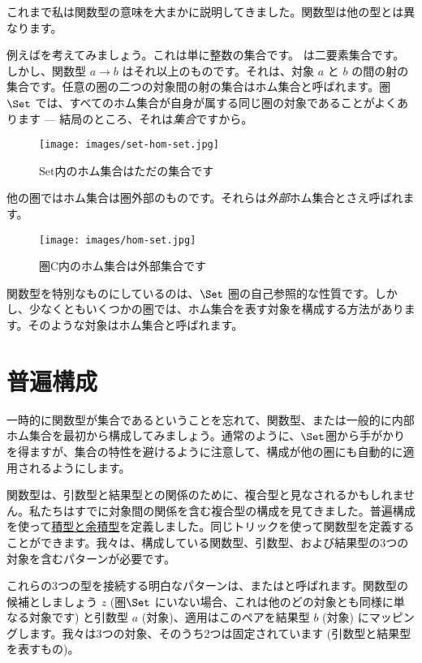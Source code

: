 
\lettrine[lhang=0.17]{こ}{れまで}私は関数型の意味を大まかに説明してきました。関数型は他の型とは異なります。

例えばを考えてみましょう。これは単に整数の集合です。
は二要素集合です。しかし、関数型 $a\to b$ はそれ以上のものです。それは、対象 $a$ と $b$ の間の射の集合です。任意の圏の二つの対象間の射の集合はホム集合と呼ばれます。圏 $\Set$ では、すべてのホム集合が自身が属する同じ圏の対象であることがよくあります  --- 結局のところ、それは\emph{集合}ですから。

\begin{figure}[H]
  \centering
  \texttt{[image: images/set-hom-set.jpg]}
  \caption{Set内のホム集合はただの集合です}
\end{figure}

\noindent
他の圏ではホム集合は圏外部のものです。それらは\emph{外部}ホム集合とさえ呼ばれます。

\begin{figure}[H]
  \centering
  \texttt{[image: images/hom-set.jpg]}
  \caption{圏C内のホム集合は外部集合です}
\end{figure}

\noindent
関数型を特別なものにしているのは、$\Set$ 圏の自己参照的な性質です。しかし、少なくともいくつかの圏では、ホム集合を表す対象を構成する方法があります。そのような対象はホム集合と呼ばれます。

\section{普遍構成}

一時的に関数型が集合であるということを忘れて、関数型、または一般的に内部ホム集合を最初から構成してみましょう。通常のように、$\Set$圏から手がかりを得ますが、集合の特性を避けるように注意して、構成が他の圏にも自動的に適用されるようにします。

関数型は、引数型と結果型との関係のために、複合型と見なされるかもしれません。私たちはすでに対象間の関係を含む複合型の構成を見てきました。普遍構成を使って\hyperref[products-and-coproducts]{積型と余積型}を定義しました。同じトリックを使って関数型を定義することができます。我々は、構成している関数型、引数型、および結果型の3つの対象を含むパターンが必要です。

これらの3つの型を接続する明白なパターンは、またはと呼ばれます。関数型の候補としましょう $z$ (圏$\Set$ にいない場合、これは他のどの対象とも同様に単なる対象です) と引数型 $a$ (対象)、適用はこのペアを結果型 $b$ (対象) にマッピングします。我々は3つの対象、そのうち2つは固定されています (引数型と結果型を表すもの)。

